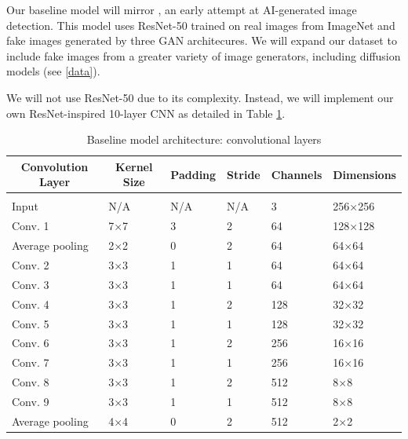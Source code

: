 \documentclass{article} %
\begin{document}
Our baseline model will mirror \citet{wang2020cnngeneratedimagessurprisinglyeasy}, an early attempt at AI-generated image detection. This model uses ResNet-50 trained on real images from ImageNet and fake images generated by three GAN architecures. We will expand our dataset to include fake images from a greater variety of image generators, including diffusion models (see \ref{data}).

We will not use ResNet-50 due to its complexity. Instead, we will implement our own ResNet-inspired 10-layer CNN as detailed in Table \ref{baseline_arch}.

    \begin{table}[t]
    \caption{Baseline model architecture: convolutional layers}
    \label{baseline_arch}
    \begin{center}
    \begin{tabular}{llllll}
    \multicolumn{1}{c}{\bf Convolution Layer}   & \multicolumn{1}{c}{\bf Kernel Size}   & \multicolumn{1}{c}{\bf Padding}    & \multicolumn{1}{c}{\bf Stride}   & \multicolumn{1}{c}{\bf Channels}   & \multicolumn{1}{c}{\bf Dimensions}
    \\ \hline \\
    Input               & N/A   & N/A   & N/A   & 3     & 256×256 \\
    Conv. 1             & 7×7   & 3     & 2     & 64    & 128×128 \\
    Average pooling     & 2×2   & 0     & 2     & 64    & 64×64 \\
    Conv. 2             & 3×3   & 1     & 1     & 64    & 64×64 \\
    Conv. 3             & 3×3   & 1     & 1     & 64    & 64×64 \\
    Conv. 4             & 3×3   & 1     & 2     & 128   & 32×32 \\
    Conv. 5             & 3×3   & 1     & 1     & 128   & 32×32 \\
    Conv. 6             & 3×3   & 1     & 2     & 256   & 16×16 \\
    Conv. 7             & 3×3   & 1     & 1     & 256   & 16×16 \\
    Conv. 8             & 3×3   & 1     & 2     & 512   & 8×8 \\
    Conv. 9             & 3×3   & 1     & 1     & 512   & 8×8 \\
    Average pooling     & 4×4   & 0     & 2     & 512   & 2×2 \\
    \end{tabular}
    \end{center}
    \end{table}
\end{document}
